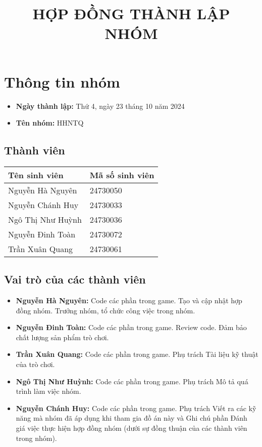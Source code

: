 \documentclass{article}
\title{HỢP ĐỒNG THÀNH LẬP NHÓM}
\date{}
\begin{document}
\maketitle

\tableofcontents
\newpage

\section{Thông tin nhóm}
\begin{itemize}
    \item \textbf{Ngày thành lập:} Thứ 4, ngày 23 tháng 10 năm 2024
    \item \textbf{Tên nhóm:} HHNTQ
\end{itemize}

\subsection{Thành viên}
\begin{tabularx}{\textwidth}{|X|X|}
\hline
\textbf{Tên sinh viên} & \textbf{Mã số sinh viên} \\
\hline
Nguyễn Hà Nguyên & 24730050 \\
Nguyễn Chánh Huy & 24730033 \\
Ngô Thị Như Huỳnh & 24730036 \\
Nguyễn Đinh Toàn & 24730072 \\
Trần Xuân Quang & 24730061 \\
\hline
\end{tabularx}

\subsection{Vai trò của các thành viên}
\begin{itemize}
    \item \textbf{Nguyễn Hà Nguyên:} Code các phần trong game. Tạo và cập nhật hợp đồng nhóm. Trưởng nhóm, tổ chức công việc trong nhóm.
    \item \textbf{Nguyễn Đinh Toàn:} Code các phần trong game. Review code. Đảm bảo chất lượng sản phẩm trò chơi.
    \item \textbf{Trần Xuân Quang:} Code các phần trong game. Phụ trách Tài liệu kỹ thuật của trò chơi.
    \item \textbf{Ngô Thị Như Huỳnh:} Code các phần trong game. Phụ trách Mô tả quá trình làm việc nhóm.
    \item \textbf{Nguyễn Chánh Huy:} Code các phần trong game. Phụ trách Viết ra các kỹ năng mà nhóm đã áp dụng khi tham gia đồ án này và Ghi chú phần Đánh giá việc thực hiện hợp đồng nhóm (dưới sự đồng thuận của các thành viên trong nhóm).
\end{itemize}
\end{document}
